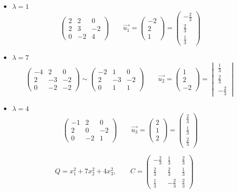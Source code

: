 \begin{itemize}
	\item $ \lambda = 1 $
    $$
    \begin{pmatrix}
    	2 & 2 & 0 \\
        2 & 3 & -2 \\
        0 & -2 & 4
    \end{pmatrix} \qquad \vec{u_1} =
    \begin{pmatrix}
    	-2 \\
        2 \\
        1
    \end{pmatrix} =
    \begin{pmatrix}
    	-\frac23 \\
        \frac23 \\
        \frac13
    \end{pmatrix} $$
    \item $ \lambda = 7 $
    $$
    \begin{pmatrix}
    	-4 & 2 & 0 \\
        2 & -3 & -2 \\
        0 & -2 & -2
    \end{pmatrix} \sim
    \begin{pmatrix}
    	-2 & 1 & 0 \\
        2 & -3 & -2 \\
        0 & 1 & 1
    \end{pmatrix} \qquad \vec{u_2} =
    \begin{pmatrix}
    	1 \\
        2 \\
        -2
    \end{pmatrix} =
    \begin{vmatrix}
    	\frac13 \\
        \frac23 \\
        -\frac23
    \end{vmatrix} $$
    \item $ \lambda = 4 $
    $$
    \begin{pmatrix}
    	-1 & 2 & 0 \\
        2 & 0 & -2 \\
        0 & -2 & 1
    \end{pmatrix} \qquad \vec{u_3} =
    \begin{pmatrix}
    	2 \\
        1 \\
        2
    \end{pmatrix} =
    \begin{pmatrix}
    	\frac23 \\
        \frac13 \\
        \frac23
    \end{pmatrix} $$
\end{itemize}
$$ Q = x_1^2 + 7x_2^2 + 4x_3^2, \qquad C =
\begin{pmatrix}
	-\frac23 & \frac13 & \frac23 \\
    \frac23 & \frac23 & \frac13 \\
    \frac13 & -\frac23 & \frac23
\end{pmatrix} $$


